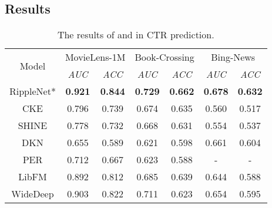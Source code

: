 \documentclass[sigconf]{acmart}
\begin{document}
	\subsection{Results}
		\begin{table}[t]
			\setlength{\abovecaptionskip}{3pt}
            \centering
            \caption{The results of  and  in CTR prediction.}
                \begin{tabular}{c|cccccc}
                    \hline
                    \multirow{2}{*}{Model} & \multicolumn{2}{c}{MovieLens-1M} & \multicolumn{2}{c}{Book-Crossing} & \multicolumn{2}{c}{Bing-News} \\
                    \cline{2-7}
                    & \textit{AUC} & \textit{ACC} & \textit{AUC} & \textit{ACC} & \textit{AUC} & \textit{ACC} \\
                    \hline
                    RippleNet* & \textbf{0.921} & \textbf{0.844} & \textbf{0.729} & \textbf{0.662} & \textbf{0.678} & \textbf{0.632} \\
                    CKE & 0.796 & 0.739 & 0.674 & 0.635 & 0.560 & 0.517 \\
                    SHINE & 0.778 & 0.732 & 0.668 & 0.631 & 0.554 & 0.537 \\
                    DKN & 0.655 & 0.589 & 0.621 & 0.598 & 0.661 & 0.604 \\
                    PER & 0.712 & 0.667 & 0.623 & 0.588 & - & - \\
                    LibFM & 0.892 & 0.812 & 0.685 & 0.639 & 0.644 & 0.588 \\
                    WideDeep & 0.903 & 0.822 & 0.711 & 0.623 & 0.654 & 0.595 \\
                    \hline
				\end{tabular}
			\label{table:ctr}
			\footnotesize {}
		\end{table}
		
\end{document}
